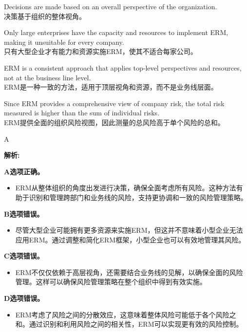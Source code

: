 \documentclass{article}
\newenvironment{explanation}
{\textbf{解析:}\par}
{\par}
\begin{document}
\begin{choices}
    \item Decisions are made based on an overall perspective of the organization. \\
    决策基于组织的整体视角。
    \item Only large enterprises have the capacity and resources to implement ERM, making it unsuitable for every company. \\
    只有大型企业才有能力和资源实施ERM，使其不适合每家公司。
    \item ERM is a consistent approach that applies top-level perspectives and resources, not at the business line level. \\
    ERM是一种一致的方法，适用于顶层视角和资源，而不是业务线层面。
    \item Since ERM provides a comprehensive view of company risk, the total risk measured is higher than the sum of individual risks. \\
    ERM提供全面的组织风险视图，因此测量的总风险高于单个风险的总和。
\end{choices}

\begin{correctanswer}
    A
\end{correctanswer}

\begin{explanation}
    \textbf{A选项正确。}
    \begin{itemize}
        \item ERM从整体组织的角度出发进行决策，确保全面考虑所有风险。这种方法有助于识别和管理跨部门和业务线的风险，支持更协调和一致的风险管理策略。
    \end{itemize}

    \textbf{B选项错误。}
    \begin{itemize}
        \item 尽管大型企业可能拥有更多资源来实施ERM，但这并不意味着小型企业无法应用ERM。通过调整和简化ERM框架，小型企业也可以有效地管理其风险。
    \end{itemize}

    \textbf{C选项错误。}
    \begin{itemize}
        \item ERM不仅仅依赖于高层视角，还需要结合业务线的见解，以确保全面的风险管理。这样可以确保风险管理策略在整个组织中得到有效实施。
    \end{itemize}

    \textbf{D选项错误。}
    \begin{itemize}
        \item ERM考虑了风险之间的分散效应，这意味着整体风险可能低于各个风险之和。通过识别和利用风险之间的相关性，ERM可以实现更有效的风险控制。
    \end{itemize}
\end{explanation}
\end{document}
